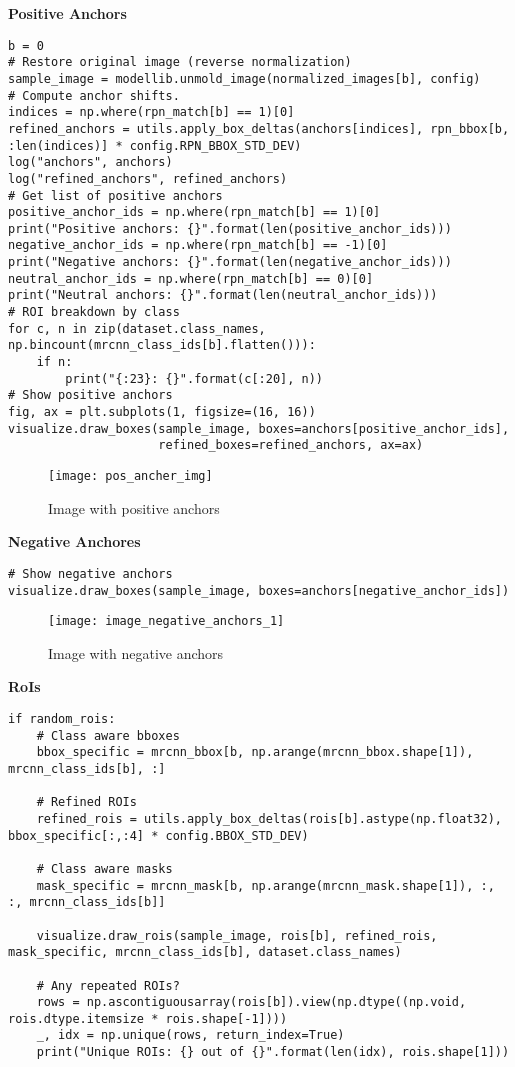 \newpage
\textbf{Positive Anchors}
\begin{lstlisting}
b = 0
# Restore original image (reverse normalization)
sample_image = modellib.unmold_image(normalized_images[b], config)
# Compute anchor shifts.
indices = np.where(rpn_match[b] == 1)[0]
refined_anchors = utils.apply_box_deltas(anchors[indices], rpn_bbox[b, :len(indices)] * config.RPN_BBOX_STD_DEV)
log("anchors", anchors)
log("refined_anchors", refined_anchors)
# Get list of positive anchors
positive_anchor_ids = np.where(rpn_match[b] == 1)[0]
print("Positive anchors: {}".format(len(positive_anchor_ids)))
negative_anchor_ids = np.where(rpn_match[b] == -1)[0]
print("Negative anchors: {}".format(len(negative_anchor_ids)))
neutral_anchor_ids = np.where(rpn_match[b] == 0)[0]
print("Neutral anchors: {}".format(len(neutral_anchor_ids)))
# ROI breakdown by class
for c, n in zip(dataset.class_names, np.bincount(mrcnn_class_ids[b].flatten())):
    if n:
        print("{:23}: {}".format(c[:20], n))
# Show positive anchors
fig, ax = plt.subplots(1, figsize=(16, 16))
visualize.draw_boxes(sample_image, boxes=anchors[positive_anchor_ids], 
                     refined_boxes=refined_anchors, ax=ax)
\end{lstlisting}

\begin{figure}[h!]
  \centering
  \texttt{[image: pos\_ancher\_img]}
  \caption[Image with positive anchors]
   {Image with positive anchors}
   \label{fig:posanchors}
\end{figure}

\textbf{Negative Anchores}
\begin{lstlisting}
# Show negative anchors
visualize.draw_boxes(sample_image, boxes=anchors[negative_anchor_ids])
\end{lstlisting}
\begin{figure}[t]
  \centering
  \texttt{[image: image\_negative\_anchors\_1]}
  \caption[Image with negative anchors]
   {Image with negative anchors}
   \label{fig:neganchors}
\end{figure}

\newpage
\textbf{RoIs}
\begin{lstlisting}
if random_rois:
    # Class aware bboxes
    bbox_specific = mrcnn_bbox[b, np.arange(mrcnn_bbox.shape[1]), mrcnn_class_ids[b], :]

    # Refined ROIs
    refined_rois = utils.apply_box_deltas(rois[b].astype(np.float32), bbox_specific[:,:4] * config.BBOX_STD_DEV)

    # Class aware masks
    mask_specific = mrcnn_mask[b, np.arange(mrcnn_mask.shape[1]), :, :, mrcnn_class_ids[b]]

    visualize.draw_rois(sample_image, rois[b], refined_rois, mask_specific, mrcnn_class_ids[b], dataset.class_names)
    
    # Any repeated ROIs?
    rows = np.ascontiguousarray(rois[b]).view(np.dtype((np.void, rois.dtype.itemsize * rois.shape[-1])))
    _, idx = np.unique(rows, return_index=True)
    print("Unique ROIs: {} out of {}".format(len(idx), rois.shape[1]))
\end{lstlisting}

